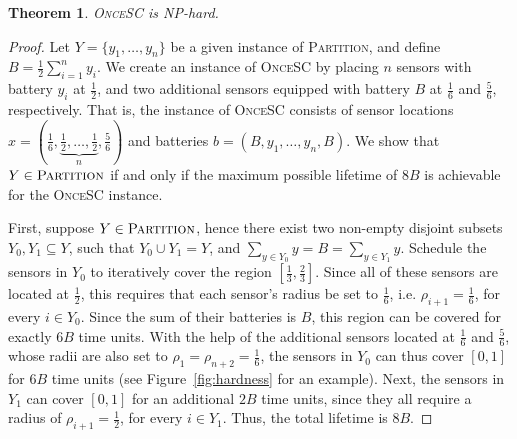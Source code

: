 \documentclass[11pt]{article}
\newtheorem{theorem}{Theorem}
\newcommand{\inv}[1]{\frac{1}{#1}}
\newcommand{\half}{\frac{1}{2}}
\newcommand{\sosc}{\textsc{OnceSC}\xspace}
\newcommand{\partition}{\textsc{Partition}\xspace}
\begin{document}
\begin{theorem}
\label{thm:hardness}
\sosc is NP-hard.
\end{theorem}	
\begin{proof}Let $Y = \{y_1,\ldots,y_n\}$ be a given instance of \partition, and
define $B = \frac{1}{2} \sum_{i=1}^n y_i$.  We create an instance of
\sosc by placing $n$ sensors with battery $y_i$ at $\half$, and two
additional sensors equipped with battery $B$ at $\inv{6}$ and
$\frac{5}{6}$, respectively.  That is, the instance of \sosc consists
of sensor locations $x = (\inv{6}, \underbrace{\textstyle \half,
\ldots, \half}_n, \frac{5}{6} )$ and batteries $b = (B,y_1,\ldots,y_n,
B)$.  We show that $Y \in \partition$ if and only if the maximum
possible lifetime of $8B$ is achievable for the \sosc instance.
		
First, suppose $Y \in \partition$, hence there exist two non-empty
disjoint subsets $Y_0, Y_1 \subseteq Y$, such that $Y_0 \cup Y_1 = Y$,
and $\sum_{y \in Y_0} y = B = \sum_{y \in Y_1} y$.  Schedule the
sensors in $Y_0$ to iteratively cover the region
$[\inv{3},\frac{2}{3}]$.  Since all of these sensors are located at
$\half$, this requires that each sensor's radius be set to $\inv{6}$,
i.e. $\rho_{i+1} = \inv{6}$, for every $i \in Y_0$.
Since the sum of their batteries is $B$, this region can be covered
for exactly $6B$ time units.  With the help of the additional sensors
located at $\inv{6}$ and $\frac{5}{6}$, whose radii are also set to
$\rho_1 = \rho_{n+2} = \inv{6}$, the sensors in $Y_0$ can thus cover
$[0,1]$ for $6B$ time units (see Figure~\ref{fig:hardness} for an
example).  Next, the sensors in $Y_1$ can cover $[0,1]$ for an
additional $2B$ time units, since they all require a radius of
$\rho_{i+1} = \half$, for every $i \in Y_1$.  Thus, the total lifetime
is $8B$.


\end{proof}
\end{document}
